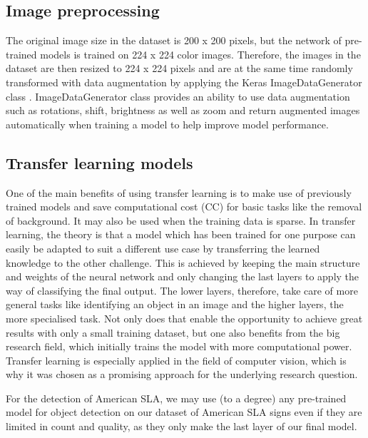 \subsection{Image preprocessing}
The original image size in the dataset is 200 x 200 pixels, but the network of pre-trained models is trained on 224 x 224 color images. Therefore, the images in the dataset are then resized to 224 x 224 pixels and are at the same time randomly transformed with data augmentation by applying the Keras ImageDataGenerator class \cite{keras}. ImageDataGenerator class provides an ability to use data augmentation such as rotations, shift, brightness as well as zoom and return augmented images automatically when training a model to help improve model performance.

\subsection{Transfer learning models}\label{chapter_models}
One of the main benefits of using transfer learning is to make use of previously trained models and save computational cost (CC) for basic tasks like the removal of background. It may also be used when the training data is sparse. In transfer learning, the theory is that a model which has been trained for one purpose can easily be adapted to suit a different use case by transferring the learned knowledge to the other challenge\cite{zhuang2020comprehensive}. This is achieved by keeping the main structure and weights of the neural network and only changing the last layers to apply the way of classifying the final output. The lower layers, therefore, take care of more general tasks like identifying an object in an image\cite{neyshabur2021transferred} and the higher layers, the more specialised task. Not only does that enable the opportunity to achieve great results with only a small training dataset, but one also benefits from the big research field, which initially trains the model with more computational power. Transfer learning is especially applied in the field of computer vision, which is why it was chosen as a promising approach for the underlying research question.

For the detection of American SLA, we may use (to a degree) any pre-trained model for object detection on our dataset of American SLA signs even if they are limited in count and quality, as they only make the last layer of our final model.

